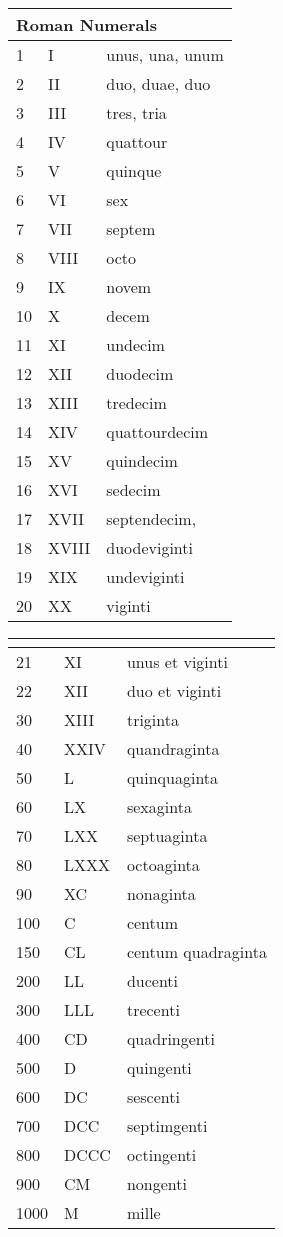\documentclass[11pt,a4paper]{article}
\begin{document}
\begin{table}[H]
\begin{tabular}{lll}
\multicolumn{3}{l}{\textbf{Roman Numerals}} \\ \midrule
1 	& I 	& unus, una, unum 	\\ 
2 	& II	& duo, duae, duo  	\\ 
3 	& III	& tres, tria 		\\ 
4 	& IV 	& quattour			\\ 
5 	& V 	& quinque 			\\ 
6 	& VI 	& sex 				\\ 
7 	& VII 	& septem 		 	\\ 
8 	& VIII 	& octo 				\\ 
9 	& IX 	& novem 			\\ 
10 	& X 	& decem 			\\  \midrule
11 	& XI 	& undecim 			\\ 
12 	& XII 	& duodecim 			\\ 
13 	& XIII 	& tredecim 			\\ 
14 	& XIV 	& quattourdecim 	\\ 
15 	& XV 	& quindecim 		\\  
16 	& XVI 	& sedecim 			\\ 
17 	& XVII 	& septendecim, 		\\ 
18 	& XVIII & duodeviginti 		\\ 
19 	& XIX 	& undeviginti 		\\ 
20 	& XX 	& viginti 			\\  \midrule
\end{tabular} 
\quad
\begin{tabular}{lll}
\multicolumn{3}{c}{} \\ \midrule
21	& XI 	& unus et viginti	\\ 
22	& XII 	& duo et viginti 	\\ 
30	& XIII 	& triginta			\\ 
40	& XXIV 	& quandraginta 		\\
50	& L 	& quinquaginta 		\\ 
60	& LX 	& sexaginta			\\ 
70	& LXX 	& septuaginta		\\  
80	& LXXX 	& octoaginta		\\
90	& XC 	& nonaginta			\\ 
100	& C 	& centum 			\\ \midrule
150	& CL	& centum quadraginta\\ 
200	& LL 	& ducenti 			\\ 
300	& LLL 	& trecenti			\\ 
400	& CD 	& quadringenti 		\\
500	& D 	& quingenti 		\\ 
600	& DC 	& sescenti			\\ 
700	& DCC 	& septimgenti		\\  
800	& DCCC 	& octingenti		\\
900& CM 	& nongenti			\\ 
1000& M 	& mille 			\\ \midrule
\end{tabular} 
\end{table}
\end{document}
